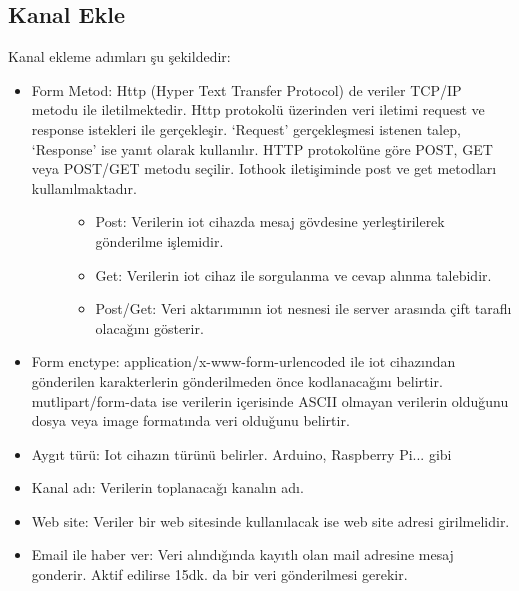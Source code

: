 \documentclass[letterpaper,10pt,turkish]{sphinxmanual}
\begin{document}
\subsection{Kanal Ekle}
\label{\detokenize{create-new-channel:kanal-ekle}}
Kanal ekleme adımları şu şekildedir:
\begin{itemize}
\item {} \begin{description}
\item[{Form Metod: Http (Hyper Text Transfer Protocol) de veriler TCP/IP metodu ile iletilmektedir. Http protokolü üzerinden veri iletimi request ve response istekleri ile gerçekleşir. ‘Request’ gerçekleşmesi istenen     talep, ‘Response’ ise yanıt olarak kullanılır. HTTP protokolüne göre POST, GET veya POST/GET metodu seçilir. Iothook iletişiminde post ve get metodları kullanılmaktadır.}] \leavevmode\begin{itemize}
\item {} 
Post: Verilerin iot cihazda mesaj gövdesine yerleştirilerek gönderilme işlemidir.

\item {} 
Get: Verilerin iot cihaz ile sorgulanma ve cevap alınma talebidir.

\item {} 
Post/Get: Veri aktarımının iot nesnesi ile server arasında çift taraflı olacağını gösterir.

\end{itemize}

\end{description}

\item {} 
Form enctype: \sphinxquotedblleft{}application/x-www-form-urlencoded\sphinxquotedblright{} ile iot cihazından gönderilen karakterlerin gönderilmeden önce kodlanacağını belirtir. \sphinxquotedblleft{}mutlipart/form-data\sphinxquotedblright{} ise verilerin içerisinde ASCII olmayan verilerin olduğunu dosya veya image formatında veri olduğunu belirtir.

\item {} 
Aygıt türü: Iot cihazın türünü belirler. Arduino, Raspberry Pi... gibi

\item {} 
Kanal adı: Verilerin toplanacağı kanalın adı.

\item {} 
Web site: Veriler bir web sitesinde kullanılacak ise web site adresi girilmelidir.

\item {} 
Email ile haber ver: Veri alındığında kayıtlı olan mail adresine mesaj gonderir. Aktif edilirse 15dk. da bir veri gönderilmesi gerekir.


\end{itemize}
\end{document}
